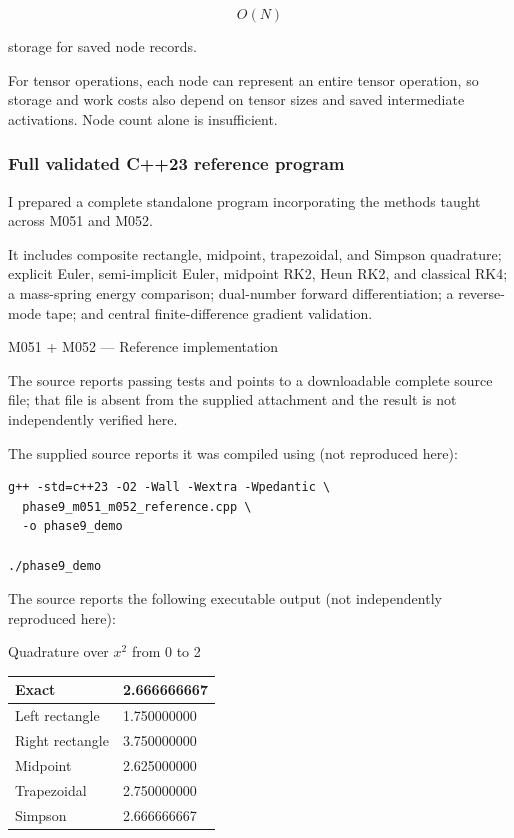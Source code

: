 \[
O(N)
\]

storage for saved node records.

For tensor operations, each node can represent an entire tensor operation, so storage and work costs also depend on tensor sizes and saved intermediate activations. Node count alone is insufficient.

\subsubsection{Full validated C++23 reference program}\label{full-validated-c23-reference-program}

I prepared a complete standalone program incorporating the methods taught across M051 and M052.

It includes composite rectangle, midpoint, trapezoidal, and Simpson quadrature; explicit Euler, semi-implicit Euler, midpoint RK2, Heun RK2, and classical RK4; a mass-spring energy comparison; dual-number forward differentiation; a reverse-mode tape; and central finite-difference gradient validation.

M051 + M052 --- Reference implementation

The source reports passing tests and points to a downloadable complete source file; that file is absent from the supplied attachment and the result is not independently verified here.

The supplied source reports it was compiled using (not reproduced here):

\begin{verbatim}
g++ -std=c++23 -O2 -Wall -Wextra -Wpedantic \
  phase9_m051_m052_reference.cpp \
  -o phase9_demo

./phase9_demo
\end{verbatim}

The source reports the following executable output (not independently reproduced here):

Quadrature over \(x^2\) from 0 to 2

{\def\LTcaptype{none} %
\begin{longtable}[]{@{}ll@{}}
\toprule\noalign{}
Exact & 2.666666667 \\
\midrule\noalign{}
\endhead
\bottomrule\noalign{}
\endlastfoot
Left rectangle & 1.750000000 \\
Right rectangle & 3.750000000 \\
Midpoint & 2.625000000 \\
Trapezoidal & 2.750000000 \\
Simpson & 2.666666667 \\
\end{longtable}
}

